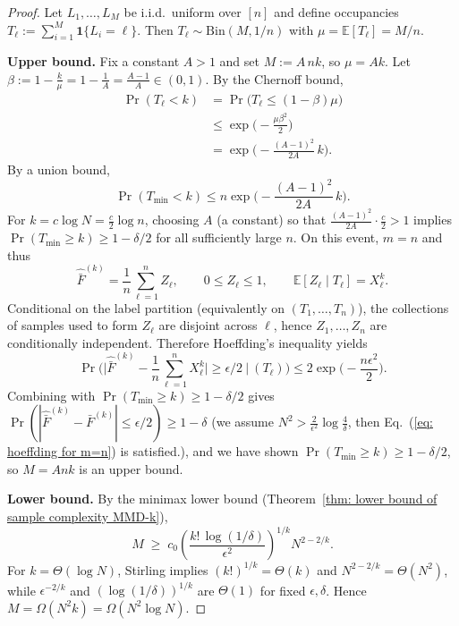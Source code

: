 \documentclass[aps,prx,reprint,superscriptaddress,amsmath,amssymb,longbibliography,floatfix]{revtex4-2}
\theoremstyle{plain}
\theoremstyle{definition}
\theoremstyle{remark}
\begin{document}
\begin{proof}
Let $L_1,\dots,L_M$ be i.i.d.\ uniform over $[n]$ and define occupancies
$T_\ell:=\sum_{i=1}^M \mathbf 1\{L_i=\ell\}$. Then $T_\ell\sim \mathrm{Bin}(M,1/n)$ with
$\mu=\mathbb E[T_\ell]=M/n$.

\textbf{Upper bound.}
Fix a constant $A>1$ and set $M:=A\,nk$, so $\mu=Ak$.
Let $\beta:=1-\frac{k}{\mu}=1-\frac1A=\frac{A-1}{A}\in(0,1)$. By the Chernoff bound,
\[
\begin{aligned}
\Pr(T_\ell<k)&=\Pr\big(T_\ell\le (1-\beta)\mu\big)
\\
&\le \exp\!\Big(-\frac{\mu\beta^2}{2}\Big)\\
&=\exp\!\Big(-\frac{(A-1)^2}{2A}\,k\Big).
\end{aligned}
\]
By a union bound,
\[
\Pr(T_{\min}<k)\le n\exp\!\Big(-\frac{(A-1)^2}{2A}\,k\Big).
\]
For $k=c\log N=\tfrac{c}{2}\log n$, choosing $A$ (a constant) so that
$\frac{(A-1)^2}{2A}\cdot \frac{c}{2}>1$ implies $\Pr(T_{\min}\ge k)\ge 1-\delta/2$
for all sufficiently large $n$. On this event, $m=n$ and thus
\[
\widehat{\bar F}^{(k)}=\frac{1}{n}\sum_{\ell=1}^n Z_\ell,
\qquad 0\le Z_\ell\le 1,\qquad \mathbb E[Z_\ell\mid T_\ell]=X_\ell^k.
\]
Conditional on the label partition (equivalently on $(T_1,\dots,T_n)$), the collections
of samples used to form $Z_\ell$ are disjoint across $\ell$, hence $Z_1,\dots,Z_n$
are conditionally independent. Therefore Hoeffding's inequality yields
\begin{equation}
\Pr\!\Big(\Big|\widehat{\bar F}^{(k)}-\frac1n\sum_{\ell=1}^n X_\ell^k\Big|\ge \epsilon/2\ \Big|\ (T_\ell)\Big)
\le 2\exp\!\Big(-\frac{n\epsilon^2}{2}\Big).\label{eq: hoeffding for m=n}
\end{equation}
Combining with $\Pr(T_{\min}\ge k)\ge 1-\delta/2$ gives
$\Pr(|\widehat{\bar F}^{(k)}-\bar F^{(k)}|\le \epsilon/2)\ge 1-\delta$
(we assume $N^2 > \frac{2}{\epsilon^2}\log \frac{4}{\delta}$, then Eq.~(\ref{eq: hoeffding for m=n}) is satisfied.), and we have shown $\Pr(T_{\min}\ge k)\ge 1-\delta/2$, so $M=Ank$ is an upper bound. 

\textbf{Lower bound.}
By the minimax lower bound (Theorem~\ref{thm: lower bound of sample complexity MMD-k}),
\[
M \;\ge\; c_0\left(\frac{k!\,\log(1/\delta)}{\epsilon^2}\right)^{\!1/k} N^{2-2/k}.
\]
For $k=\Theta(\log N)$, Stirling implies $(k!)^{1/k}=\Theta(k)$ and
$N^{2-2/k}=\Theta(N^2)$, while $\epsilon^{-2/k}$ and $(\log(1/\delta))^{1/k}$
are $\Theta(1)$ for fixed $\epsilon,\delta$. Hence $M=\Omega(N^2k)=\Omega(N^2\log N)$.
\end{proof}
\end{document}
